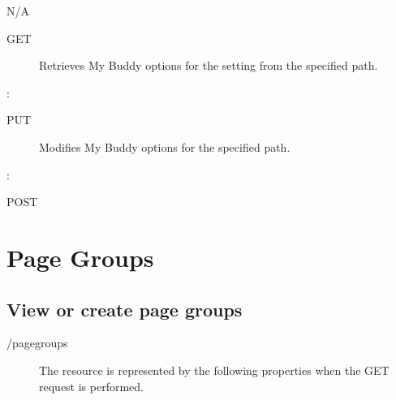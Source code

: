 \documentclass[letterpaper,10pt,english]{sphinxmanual}
\begin{document}
 N/A
\begin{description}
\item[{ GET}] \leavevmode
Retrieves My Buddy options for the setting from the specified path.

\end{description}

:

\begin{sphinxVerbatim}[commandchars=\\\{\}]
\end{sphinxVerbatim}
\begin{description}
\item[{ PUT}] \leavevmode
Modifies My Buddy options for the specified path.

\end{description}

:

\begin{sphinxVerbatim}[commandchars=\\\{\}]
\end{sphinxVerbatim}

 POST


\section{Page Groups}
\label{\detokenize{restapi:page-groups}}

\subsection{View or create page groups}
\label{\detokenize{restapi:view-or-create-page-groups}}
 /pagegroups
\begin{description}
\item[{}] \leavevmode
The resource is represented by the following properties when the GET request is performed.

\end{description}
\end{document}
